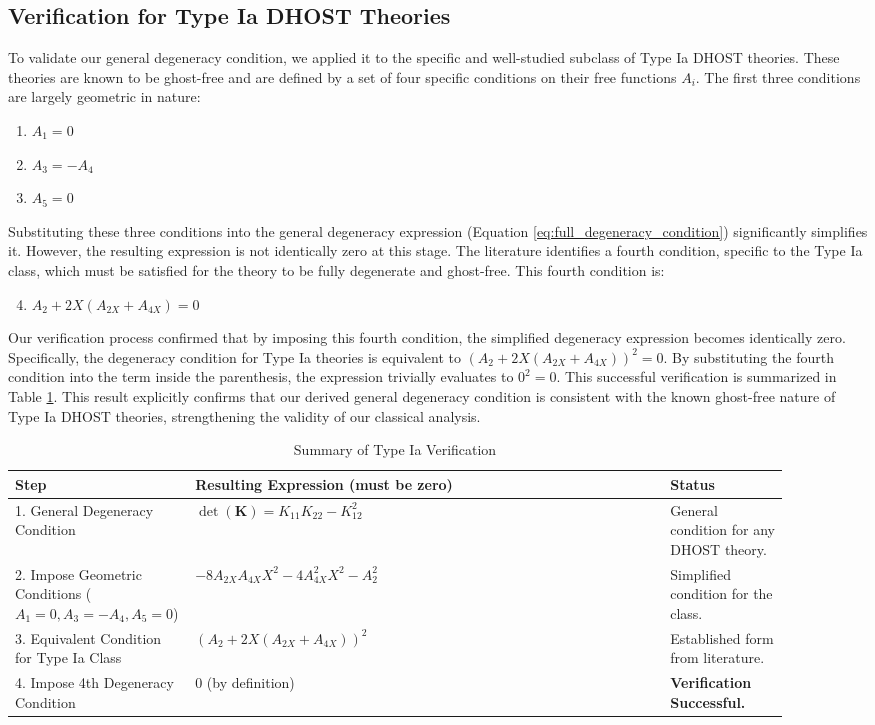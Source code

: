 \documentclass[twocolumn]{aastex631}
\begin{document}
\subsection{Verification for Type Ia DHOST Theories}

To validate our general degeneracy condition, we applied it to the specific and well-studied subclass of Type Ia DHOST theories. These theories are known to be ghost-free and are defined by a set of four specific conditions on their free functions $A_i$. The first three conditions are largely geometric in nature:
\begin{enumerate}
    \item $A_1 = 0$
    \item $A_3 = -A_4$
    \item $A_5 = 0$
\end{enumerate}
Substituting these three conditions into the general degeneracy expression (Equation \ref{eq:full_degeneracy_condition}) significantly simplifies it. However, the resulting expression is not identically zero at this stage. The literature identifies a fourth condition, specific to the Type Ia class, which must be satisfied for the theory to be fully degenerate and ghost-free. This fourth condition is:
\begin{enumerate}
    \setcounter{enumi}{3}
    \item $A_2 + 2X(A_{2X} + A_{4X}) = 0$
\end{enumerate}
Our verification process confirmed that by imposing this fourth condition, the simplified degeneracy expression becomes identically zero. Specifically, the degeneracy condition for Type Ia theories is equivalent to $\left( A_2 + 2X(A_{2X} + A_{4X}) \right)^2 = 0$. By substituting the fourth condition into the term inside the parenthesis, the expression trivially evaluates to $0^2 = 0$. This successful verification is summarized in Table \ref{tab:typeia_verification}. This result explicitly confirms that our derived general degeneracy condition is consistent with the known ghost-free nature of Type Ia DHOST theories, strengthening the validity of our classical analysis.

\begin{table}[h!]
\centering
\caption{Summary of Type Ia Verification}
\label{tab:typeia_verification}
\begin{tabular}{p{0.15\linewidth}|p{0.6\linewidth}|p{0.15\linewidth}}
\hline
\textbf{Step} & \textbf{Resulting Expression (must be zero)} & \textbf{Status} \\ \hline
1. General Degeneracy Condition & $\det(\mathbf{K}) = K_{11}K_{22} - K_{12}^2$ & General condition for any DHOST theory. \\
2. Impose Geometric Conditions ($A_1=0, A_3=-A_4, A_5=0$) & $-8A_{2X}A_{4X}X^2 - 4A_{4X}^2X^2 - A_2^2$ & Simplified condition for the class. \\
3. Equivalent Condition for Type Ia Class & $(A_2 + 2X(A_{2X} + A_{4X}))^2$ & Established form from literature. \\
4. Impose 4th Degeneracy Condition & $0$ (by definition) & \textbf{Verification Successful.} \\ \hline
\end{tabular}
\end{table}
\end{document}
